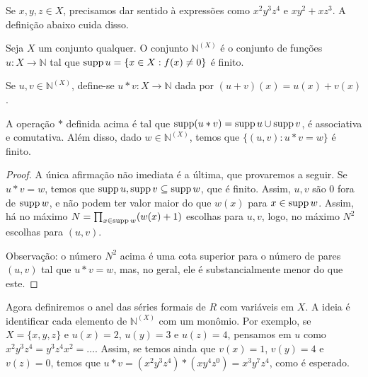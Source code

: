Se $x, y, z \in X$, precisamos dar sentido à expressões como $x^2y^3z^4$ e $xy^2+xz^3$. A definição abaixo cuida disso.

\begin{definition}
    Seja $X$ um conjunto qualquer. O conjunto $\mathbb N^{(X)}$ é o conjunto de funções $u:X\rightarrow \mathbb N$ tal que $\operatorname{supp} u=\{x \in X: f(x)\neq 0\}$ é finito.

    Se $u, v \in \mathbb N^{(X)}$, define-se $u*v:X\rightarrow \mathbb N$ dada por $(u+v)(x)=u(x)+v(x)$.
\end{definition}

\begin{lemma}
    A operação $*$ definida acima é tal que $\operatorname{supp}(u*v)= \operatorname{supp} u \cup \operatorname{supp} v$, é associativa e comutativa. Além disso, dado $w \in \mathbb N^{(X)}$, temos que $\{(u, v): u*v=w\}$ é finito.
\end{lemma}
\begin{proof}
    A única afirmação não imediata é a última, que provaremos a seguir.
    Se $u*v=w$, temos que $\operatorname{supp} u, \operatorname{supp} v\subseteq \operatorname{supp} w$, que é finito. Assim, $u, v$ são $0$ fora de $\operatorname{supp} w$, e não podem ter valor maior do que $w(x)$ para $x\in \operatorname{supp} w$. Assim, há no máximo $N=\prod_{x \in \operatorname{supp} w}(w(x)+1)$ escolhas para $u, v$, logo, no máximo $N^2$ escolhas para $(u, v)$.

    Observação: o número $N^2$ acima é uma cota superior para o número de pares $(u, v)$ tal que $u*v=w$, mas, no geral, ele é substancialmente menor do que este.
\end{proof}

Agora definiremos o anel das séries formais de $R$ com variáveis em $X$.
A ideia é identificar cada elemento de $\mathbb N^{(X)}$ com um monômio.
Por exemplo, se $X=\{x, y, z\}$ e $u(x)=2$, $u(y)=3$ e $u(z)=4$, pensamos em $u$ como $x^2y^3z^4=y^3z^4x^2=\dots$.
Assim, se temos ainda que $v(x)=1$, $v(y)=4$ e $v(z)=0$, temos que $u*v=(x^2y^3z^4)*(xy^4z^0)=x^3y^7z^4$, como é esperado.

